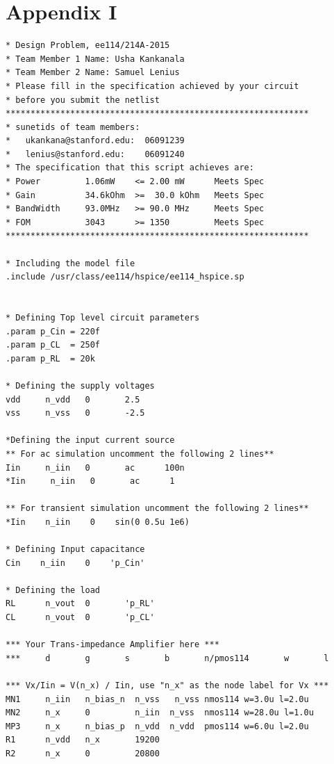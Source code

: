 \documentclass[12pt,a4paper]{article}
\begin{document}
\pagebreak



\section{Appendix I}
\begin{lstlisting}
* Design Problem, ee114/214A-2015
* Team Member 1 Name: Usha Kankanala
* Team Member 2 Name: Samuel Lenius
* Please fill in the specification achieved by your circuit
* before you submit the netlist
*************************************************************
* sunetids of team members:
*   ukankana@stanford.edu:  06091239
*   lenius@stanford.edu:    06091240
* The specification that this script achieves are:
* Power         1.06mW    <= 2.00 mW      Meets Spec
* Gain          34.6kOhm  >=  30.0 kOhm   Meets Spec
* BandWidth     93.0MHz   >= 90.0 MHz     Meets Spec
* FOM           3043      >= 1350         Meets Spec
*************************************************************

* Including the model file
.include /usr/class/ee114/hspice/ee114_hspice.sp


* Defining Top level circuit parameters
.param p_Cin = 220f
.param p_CL  = 250f
.param p_RL  = 20k

* Defining the supply voltages
vdd     n_vdd   0       2.5
vss     n_vss   0       -2.5

*Defining the input current source
** For ac simulation uncomment the following 2 lines**
Iin     n_iin   0       ac      100n
*Iin     n_iin   0       ac      1

** For transient simulation uncomment the following 2 lines**
*Iin    n_iin    0    sin(0 0.5u 1e6)

* Defining Input capacitance
Cin    n_iin    0    'p_Cin'

* Defining the load
RL      n_vout  0       'p_RL'
CL      n_vout  0       'p_CL'

*** Your Trans-impedance Amplifier here ***
***     d       g       s       b       n/pmos114       w       l

*** Vx/Iin = V(n_x) / Iin, use "n_x" as the node label for Vx ***
MN1     n_iin   n_bias_n  n_vss   n_vss nmos114 w=3.0u l=2.0u
MN2     n_x     0         n_iin  n_vss  nmos114 w=28.0u l=1.0u
MP3     n_x     n_bias_p  n_vdd  n_vdd  pmos114 w=6.0u l=2.0u
R1      n_vdd   n_x       19200
R2      n_x     0         20800


\end{lstlisting}
\end{document}

